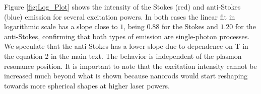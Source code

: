 \documentclass[journal=nalefd,manuscript=letter]{achemso}
\newcommand{\K}{\ensuremath{\,\textrm{K}}}
\newcommand{\nm}{\ensuremath{\,\textrm{nm}}}
\begin{document}
Figure \ref{fig:Log_Plot} shows the intensity of the Stokes (red) and
anti-Stokes (blue) emission for several excitation powers. In both cases the
linear fit in logarithmic scale has a slope close to $1$, being $0.88$ for the
Stokes and $1.20$ for the anti-Stokes, confirming that both types of emission
are single-photon processes. We speculate that the anti-Stokes has a 
lower slope due to dependence on T in the 
equation 2 in the main text. The behavior is independent of the plasmon
resonance position. It is important to note that the excitation intensity cannot
be increased much beyond what is shown because nanorods would start reshaping
towards more spherical shapes at higher laser powers.


 
\end{document}
